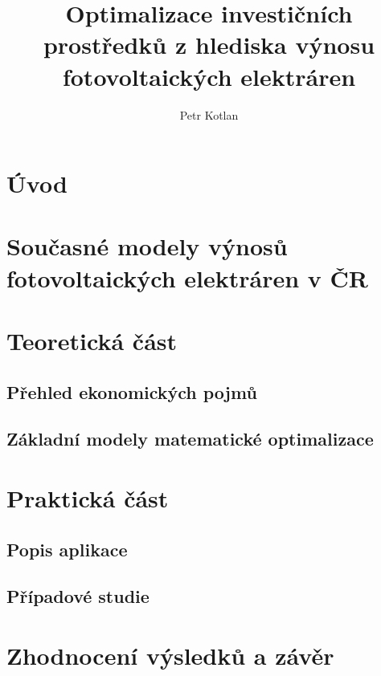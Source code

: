 \documentclass[a4paper, 12pt]{report}
\author{Petr Kotlan}
\title{Optimalizace investičních prostředků z hlediska
výnosu fotovoltaických elektráren}
\date{}
\begin{document}



\tableofcontents

\chapter*{Úvod}

\chapter{Současné modely výnosů fotovoltaických elektráren v ČR}

\chapter{Teoretická část}

\section{Přehled ekonomických pojmů}


\section{Základní modely matematické optimalizace}

\chapter{Praktická část}

\section{Popis aplikace}



\section{Případové studie}

\chapter{Zhodnocení výsledků a závěr}


\end{document}
